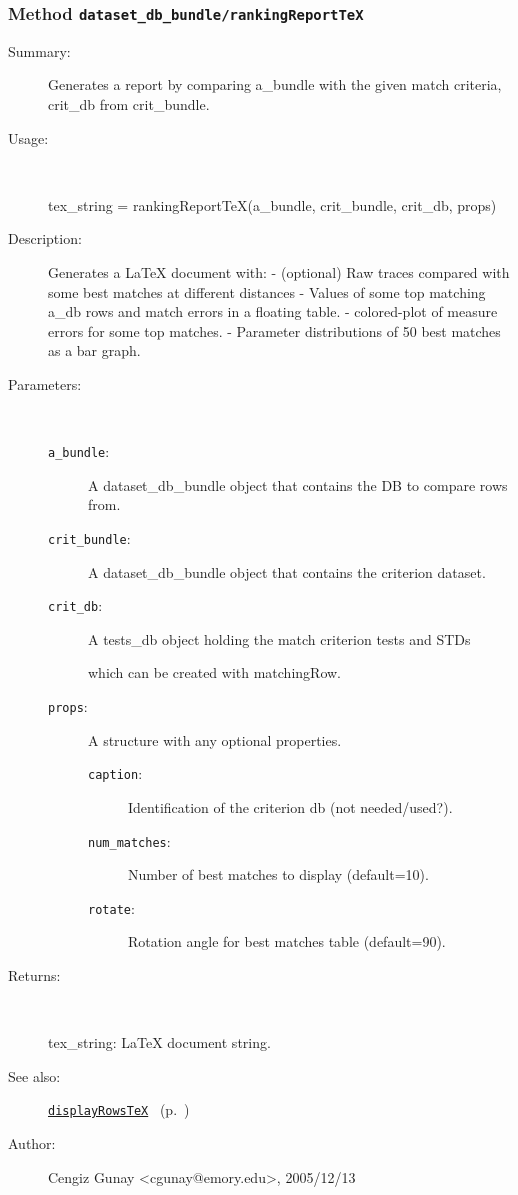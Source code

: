 \subsubsection[Method \texttt{rankingReportTeX}]{Method \texttt{dataset\_db\_bundle/rankingReportTeX}}%
%
\label{ref_dataset_db_bundle__rankingReportTeX}%
\hypertarget{ref_dataset_db_bundle__rankingReportTeX}{}%
\begin{description}
\item[Summary:]Generates a report by comparing a\_bundle with the given match criteria, crit\_db from crit\_bundle.
%
\item[Usage:]~%
\begin{lyxcode}%
tex\_string = rankingReportTeX(a\_bundle, crit\_bundle, crit\_db, props)
%
\end{lyxcode}%
%
\item[Description:]%
Generates a LaTeX document with:
	- (optional) Raw traces compared with some best matches at different distances
	- Values of some top matching a\_db rows and match errors in a floating table.
	- colored-plot of measure errors for some top matches.
	- Parameter distributions of 50 best matches as a bar graph.
\item[Parameters:]~
\begin{description}%
\item[\texttt{a\_bundle}:]
 A dataset\_db\_bundle object that contains the DB to compare rows from.
\item[\texttt{crit\_bundle}:]
 A dataset\_db\_bundle object that contains the criterion dataset.
\item[\texttt{crit\_db}:]
 A tests\_db object holding the match criterion tests and STDs

which can be created with matchingRow.\item[\texttt{props}:]
 A structure with any optional properties.
\begin{description}%
\item[\texttt{caption}:]
 Identification of the criterion db (not needed/used?).
\item[\texttt{num\_matches}:]
 Number of best matches to display (default=10).
\item[\texttt{rotate}:]
 Rotation angle for best matches table (default=90).
\end{description}%
\end{description}%
%
\item[Returns:]~

	tex\_string: LaTeX document string.
%
%
\item[See also:]%
\hyperlink{ref_displayRowsTeX}{\texttt{displayRowsTeX}}%
\ (p.~\pageref{ref_displayRowsTeX})%
%
%
\item[Author:]%
Cengiz Gunay <cgunay@emory.edu>, 2005/12/13%
\end{description}
\methodline%
